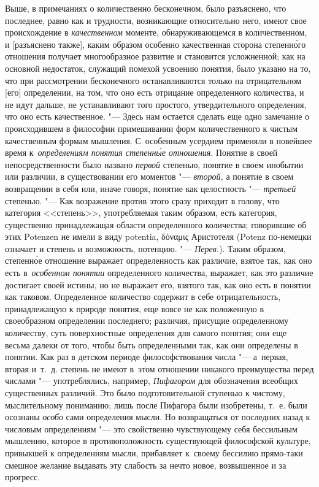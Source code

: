 Выше, в примечаниях о количественно бесконечном, было разъяснено, что
последнее, равно как и трудности, возникающие относительно него, имеют свое
происхождение в {\em качественном} моменте, обнаруживающемся в количественном,
и [разъяснено также], каким образом особенно качественная сторона
степенн\'{о}го отношения получает многообразное развитие и становится
усложненной; как на основной недостаток, служащий
помехой усвоению понятия, было указано на то, что при рассмотрении бесконечного
останавливаются только на отрицательном [его] определении, на том, что оно есть
отрицание определенного количества, и не идут дальше, не устанавливают того
простого, утвердительного определения, что оно есть качественное. "--- Здесь
нам остается сделать еще одно замечание о происходившем в философии
примешивании форм количественного к чистым качественным формам мышления.
С~особенным усердием применяли в новейшее время
к~{\em определениям понятия степенн\'{ы}е отношения}. Понятие в своей непосредственности было названо
{\em первой} степенью, понятие в своем инобытии или различии, в существовании
его моментов "--- {\em второй,} а понятие в своем возвращении в себя или, иначе
говоря, понятие как целостность "--- {\em третьей} степенью. "--- Как
возражение против этого сразу приходит в голову, что категория <<степень>>,
употребляемая таким образом, есть категория, существенно принадлежащая области
определенного количества; говорившие об этих Potenzen не имели в виду potentia,
\textgreek{δόναμις} Аристотеля (Potenz по-немецки означает и степень и
возможность, потенцию. "--- {\em Перев.}). Таким образом, степенн\'{о}е
отношение выражает определенность как различие, взятое так, как оно есть
в~{\em особенном понятии} определенного количества, выражает, как это различие
достигает своей истины, но не выражает его, взятого так, как оно есть в понятии
как таковом. Определенное количество содержит в себе отрицательность,
принадлежащую к природе понятия, еще вовсе не как положенную в своеобразном
определении последнего; различия, присущие определенному количеству, суть
поверхностные определения для самого понятия; они еще весьма далеки от того,
чтобы быть определенными так, как они определены в понятии. Как раз в детском
периоде философствования числа "--- а~первая, вторая и~т.~д. степень не имеют
в~этом отношении никакого преимущества перед числами "--- употреблялись,
например, {\em Пифагором} для обозначения всеобщих существенных различий. Это
было подготовительной ступенью к чистому, мыслительному пониманию; лишь после
Пифагора были изобретены, т.~е. были осознаны {\em особо} сами определения
мысли. Но возвращаться от последних назад к числовым определениям "--- это
свойственно чувствующему себя бессильным мышлению, которое в противоположность
существующей философской культуре, привыкшей к определениям мысли, прибавляет
к~своему бессилию прямо-таки смешное желание выдавать эту слабость за нечто
новое, возвышенное и за прогресс.

